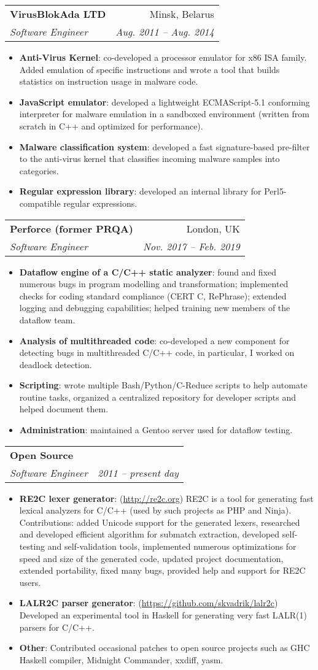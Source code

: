 \documentclass[letterpaper,11pt]{article}
\makeatletter
\newcommand{\resumeItem}[2]{
  \item\small{
    \textbf{#1}{: #2 \vspace{-2pt}}
  }
}
\newcommand{\resumeSubheading}[4]{
  \vspace{-1pt}\item[]
    \begin{tabular*}{0.97\textwidth}{l@{\extracolsep{\fill}}r}
      \textbf{#1} & #2 \\
      \textit{\small#3} & \textit{\small #4} \\
    \end{tabular*}\vspace{-5pt}
}
\newcommand{\resumeItemListStart}{\begin{itemize}}
\newcommand{\resumeItemListEnd}{\end{itemize}\vspace{-5pt}}
\makeatother
\begin{document}
    \resumeSubheading
      {VirusBlokAda LTD}{Minsk, Belarus}
      {Software Engineer}{Aug. 2011 -- Aug. 2014}
      \resumeItemListStart
        \resumeItem{Anti-Virus Kernel}
          {co-developed a processor emulator for x86 ISA family.
          Added emulation of specific instructions
          and wrote a tool that builds statistics on instruction usage in malware code.}
        \resumeItem{JavaScript emulator}
          {developed a lightweight ECMAScript-5.1 conforming interpreter for malware emulation in a sandboxed environment
          (written from scratch in C++ and optimized for performance).}
        \resumeItem{Malware classification system}
          {developed a fast signature-based pre-filter to the anti-virus kernel
          that classifies incoming malware samples into categories.}
        \resumeItem{Regular expression library}
          {developed an internal library for Perl5-compatible regular expressions.}
      \resumeItemListEnd

    \resumeSubheading
      {Perforce (former PRQA)}{London, UK}
      {Software Engineer}{Nov. 2017 -- Feb. 2019}
      \resumeItemListStart
        \resumeItem{Dataflow engine of a C/C++ static analyzer}
          {found and fixed numerous bugs in program modelling and transformation;
          implemented checks for coding standard compliance (CERT C, RePhrase);
          extended logging and debugging capabilities;
          helped training new members of the dataflow team.}
        \resumeItem{Analysis of multithreaded code}
          {co-developed a new component for detecting bugs in multithreaded C/C++ code,
          in particular, I worked on deadlock detection.}
        \resumeItem{Scripting}
          {wrote multiple Bash/Python/C-Reduce scripts to help automate routine tasks,
          organized a centralized repository for developer scripts and helped document them.}
        \resumeItem{Administration}
          {maintained a Gentoo server used for dataflow testing.}
      \resumeItemListEnd

    \resumeSubheading
      {Open Source}{}
      {Software Engineer}{2011 -- present day}
      \resumeItemListStart
        \resumeItem{RE2C lexer generator}
          {(\url{http://re2c.org})
          RE2C is a tool for generating fast lexical analyzers for C/C++
          (used by such projects as PHP and Ninja).
          Contributions:
          added Unicode support for the generated lexers,
          researched and developed efficient algorithm for submatch extraction,
          developed self-testing and self-validation tools,
          implemented numerous optimizations for speed and size of the generated code,
          updated project documentation,
          extended portability,
          fixed many bugs,
          provided help and support for RE2C users.
          }
        \resumeItem{LALR2C parser generator}
          {(\url{https://github.com/skvadrik/lalr2c})
          Developed an experimental tool in Haskell for generating very fast LALR(1) parsers for C/C++.}
        \resumeItem{Other}
          {Contributed occasional patches to open source projects such as GHC Haskell compiler, Midnight Commander, xxdiff, yasm.}
      \resumeItemListEnd
\end{document}
